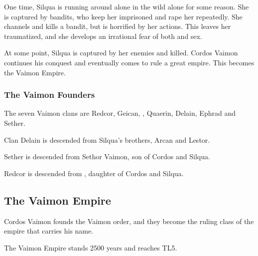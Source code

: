 One time, Silqua is running around alone in the wild alone for some reason. She is captured by bandits, who keep her imprisoned and rape her repeatedly. She channels \nieur{} and kills a bandit, but is horrified by her actions. This leaves her traumatized, and she develops an irrational fear of both \nieur{} and sex. 

At some point, Silqua is captured by her enemies and killed. Cordos Vaimon continues his conquest and eventually comes to rule a great empire. This becomes the Vaimon Empire. 

\subsubsection{The Vaimon Founders}
The seven Vaimon clans are Redcor, Geican, \Yrgell, Quaerin, Delain, Ephrad and Sether. 

Clan Delain is descended from Silqua's brothers, Arcan and Lestor. 

Sether is descended from Sethor Vaimon, son of Cordos and Silqua. 

Redcor is descended from \Racel, daughter of Cordos and Silqua. 



\subsection{The Vaimon Empire}
\label{Vaimon Empire}
\label{Origin of Vaimons}
Cordos Vaimon founds the Vaimon order, and they become the ruling class of the empire that carries his name. 

The Vaimon Empire stands 2500 years and reaches TL5. 



